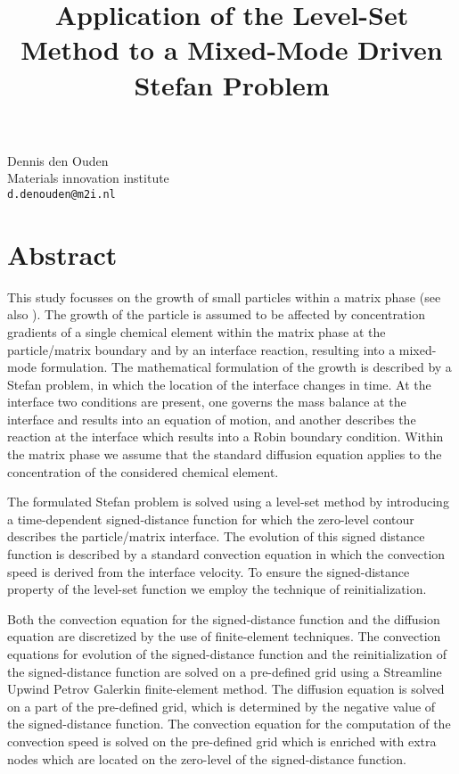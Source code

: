 \title{Application of the Level-Set Method to a Mixed-Mode Driven Stefan Problem}
 \author{} \institute{}
\maketitle
\begin{center}
{\large Dennis den Ouden}\\
Materials innovation institute\\
{\tt d.denouden@m2i.nl}

\end{center}

\section*{Abstract}

This study focusses on the growth of small particles within a matrix phase (see also \cite{ouden}). The growth of the particle is assumed to be affected by concentration gradients of a single chemical element within the matrix phase at the particle/matrix boundary and by an interface reaction, resulting into a mixed-mode formulation. The mathematical formulation of the growth is described by a Stefan problem, in which the location of the interface changes in time. At the interface two conditions are present, one governs the mass balance at the interface and results into an equation of motion, and another describes the reaction at the interface which results into a Robin boundary condition. Within the matrix phase we assume that the standard diffusion equation applies to the concentration of the considered chemical element.

The formulated Stefan problem is solved using a level-set method by introducing a time-dependent signed-distance function for which the zero-level contour describes the particle/matrix interface. The evolution of this signed distance function is described by a standard convection equation in which the convection speed is derived from the interface velocity. To ensure the signed-distance property of the level-set function we employ the technique of reinitialization.

Both the convection equation for the signed-distance function and the diffusion equation are discretized by the use of finite-element techniques. The convection equations for evolution of the signed-distance function and the reinitialization of the signed-distance function are solved on a pre-defined grid using a Streamline Upwind Petrov Galerkin finite-element method. The diffusion equation is solved on a part of the pre-defined grid, which is determined by the negative value of the signed-distance function. The convection equation for the computation of the convection speed is solved on the pre-defined grid which is enriched with extra nodes which are located on the zero-level of the signed-distance function.

